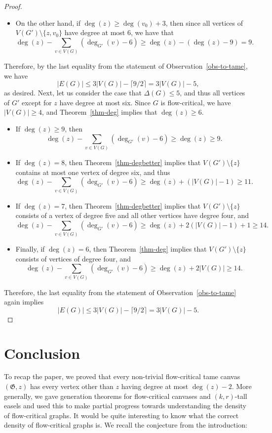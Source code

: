 \documentclass{article}
\newcommand\g{\mathfrak{G}}
\begin{document}
\begin{proof}
\begin{itemize}
\item On the other hand, if $\deg(z)\ge \deg(v_0)+3$, then since all vertices of $V(G')\setminus\{z,v_0\}$ have degree at most $6$, we have that
$$\deg(z)-\sum_{v\in V(G)} (\deg_{G'}(v)-6)\ge \deg(z)-(\deg(z)-9)=9.$$
\end{itemize}
Therefore, by the last equality from the statement of Observation~\ref{obs-to-tame},
we have 
$$|E(G)|\le 3|V(G)| - \lceil 9/2\rceil=3|V(G)|-5,$$
as desired.
Next, let us consider the case that $\Delta(G) \leq 5$, and thus all vertices of $G'$ except for $z$ have degree at most six.
Since $G$ is flow-critical, we have $|V(G)|\ge 4$, and Theorem~\ref{thm-deg} implies that $\deg(z)\ge 6$.
\begin{itemize}
\item
If $\deg(z)\ge 9$, then 
$$\deg(z)-\sum_{v\in V(G)} (\deg_{G'}(v)-6)\ge \deg(z)\ge 9.$$
\item If $\deg(z)=8$, then Theorem~\ref{thm-degbetter} implies that $V(G')\setminus\{z\}$ contains at most one vertex of degree six,
and thus
$$\deg(z)-\sum_{v\in V(G)} (\deg_{G'}(v)-6)\ge \deg(z)+(|V(G)|-1)\ge 11.$$
\item If $\deg(z)=7$, then Theorem~\ref{thm-degbetter} implies that $V(G')\setminus\{z\}$ consists of a vertex of degree five and all other
vertices have degree four, and
$$\deg(z)-\sum_{v\in V(G)} (\deg_{G'}(v)-6)\ge \deg(z)+2(|V(G)|-1)+1\ge 14.$$
\item Finally, if $\deg(z)=6$, then Theorem~\ref{thm-deg} implies that $V(G')\setminus\{z\}$ consists of vertices of degree four, and
$$\deg(z)-\sum_{v\in V(G)} (\deg_{G'}(v)-6)\ge \deg(z)+2|V(G)|\ge 14.$$
\end{itemize}
Therefore, the last equality from the statement of Observation~\ref{obs-to-tame} again implies
$$|E(G)|\le 3|V(G)| - \lceil 9/2\rceil=3|V(G)|-5.$$
\end{proof}

\section{Conclusion}
To recap the paper, we proved that every non-trivial flow-critical tame canvas
$(\g,z)$ has every vertex other than $z$ having degree at most $\deg(z) -2$.
More generally, we gave generation theorems for flow-critical canvases and
$(k,r)$-tall easels and used this to make partial progress towards
understanding the density of flow-critical graphs. It would be quite
interesting to know what the correct density of flow-critical graphs is. We
recall the conjecture from the introduction:
\end{document}
